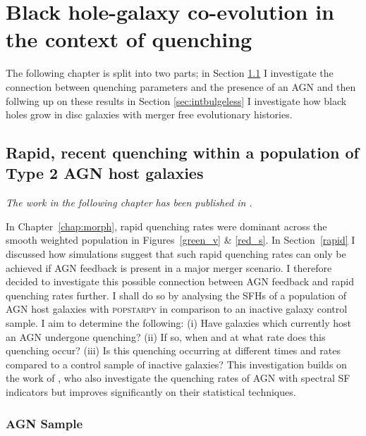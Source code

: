 
\chapter{Black hole-galaxy co-evolution in the context of quenching}\label{chap:agn}

The following chapter is split into two parts; in Section \ref{sec:agnfeedback} I investigate the connection between quenching parameters and the presence of an AGN and then follwing up on these results in Section \ref{sec:intbulgeless} I investigate how black holes grow in disc galaxies with merger free evolutionary histories. 

\section{Rapid, recent quenching within a population of Type 2 AGN host galaxies}\label{sec:agnfeedback}

\emph{The work in the following chapter has been published in \citet{smethurst16}.}

In Chapter~\ref{chap:morph}, rapid quenching rates were dominant across the smooth weighted population in Figures~\ref{green_v} \& \ref{red_s}. In Section~\ref{rapid} I discussed how simulations suggest that such rapid quenching rates can only be achieved if AGN feedback is present in a major merger scenario. I therefore decided to investigate this possible connection between AGN feedback and rapid quenching rates further. I shall do so by analysing the SFHs of a population of AGN host galaxies with \textsc{popstarpy} in comparison to an inactive galaxy control sample. I  aim to determine the following: (i) Have galaxies which currently host an AGN undergone quenching? (ii) If so, when and at what rate does this quenching occur? (iii) Is this quenching occurring at different times and rates compared to a control sample of inactive galaxies? This investigation builds on the work of \citet{Martin07}, who also investigate the quenching rates of AGN with spectral SF indicators but improves significantly on their statistical techniques.

\subsection{AGN Sample}\label{agnsample}

